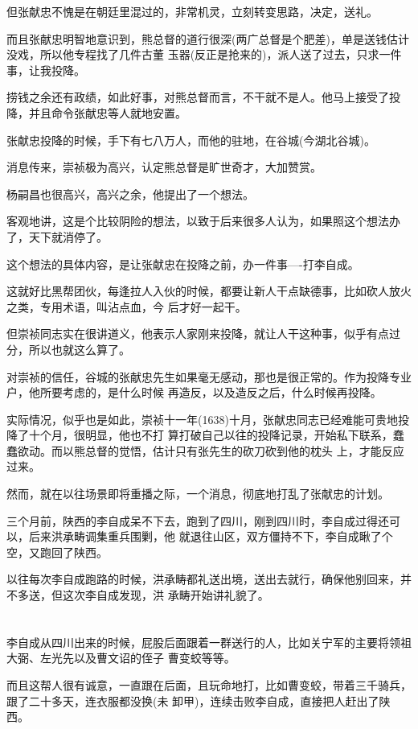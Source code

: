 \documentclass[11pt,a4paper,onecolumn]{article}
\begin{document}
但张献忠不愧是在朝廷里混过的，非常机灵，立刻转变思路，决定，送礼。

而且张献忠明智地意识到，熊总督的道行很深(两广总督是个肥差)，单是送钱估计没戏，所以他专程找了几件古董
玉器(反正是抢来的)，派人送了过去，只求一件事，让我投降。

捞钱之余还有政绩，如此好事，对熊总督而言，不干就不是人。他马上接受了投降，并且命令张献忠等人就地安置。

张献忠投降的时候，手下有七八万人，而他的驻地，在谷城(今湖北谷城)。

消息传来，崇祯极为高兴，认定熊总督是旷世奇才，大加赞赏。

杨嗣昌也很高兴，高兴之余，他提出了一个想法。

客观地讲，这是个比较阴险的想法，以致于后来很多人认为，如果照这个想法办了，天下就消停了。

这个想法的具体内容，是让张献忠在投降之前，办一件事----打李自成。

这就好比黑帮团伙，每逢拉人入伙的时候，都要让新人干点缺德事，比如砍人放火之类，专用术语，叫沾点血，今
后才好一起干。

但崇祯同志实在很讲道义，他表示人家刚来投降，就让人干这种事，似乎有点过分，所以也就这么算了。

对崇祯的信任，谷城的张献忠先生如果毫无感动，那也是很正常的。作为投降专业户，他所要考虑的，是什么时候
再造反，以及造反之后，什么时候再投降。

实际情况，似乎也是如此，崇祯十一年(1638)十月，张献忠同志已经难能可贵地投降了十个月，很明显，他也不打
算打破自己以往的投降记录，开始私下联系，蠢蠢欲动。而以熊总督的觉悟，估计只有张先生的砍刀砍到他的枕头
上，才能反应过来。

然而，就在以往场景即将重播之际，一个消息，彻底地打乱了张献忠的计划。

三个月前，陕西的李自成呆不下去，跑到了四川，刚到四川时，李自成过得还可以，后来洪承畴调集重兵围剿，他
就退往山区，双方僵持不下，李自成瞅了个空，又跑回了陕西。

以往每次李自成跑路的时候，洪承畴都礼送出境，送出去就行，确保他别回来，并不多送，但这次李自成发现，洪
承畴开始讲礼貌了。

\section[\thesection]{}

李自成从四川出来的时候，屁股后面跟着一群送行的人，比如关宁军的主要将领祖大弼、左光先以及曹文诏的侄子
曹变蛟等等。

而且这帮人很有诚意，一直跟在后面，且玩命地打，比如曹变蛟，带着三千骑兵，跟了二十多天，连衣服都没换(未
卸甲)，连续击败李自成，直接把人赶出了陕西。
\end{document}
